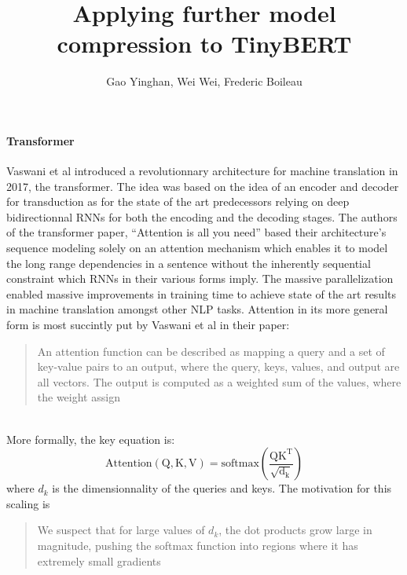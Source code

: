 \documentclass{article}
\title{\textbf{Applying further model compression to TinyBERT}}
\author{Gao Yinghan, Wei Wei, Frederic Boileau}
\begin{document}
\thispagestyle{plain}
\maketitle
\medskip


\paragraph{Transformer} Vaswani et al \cite{allyouneed} introduced a
revolutionnary architecture for machine translation in 2017, the transformer.
The idea was based on the idea of an encoder and decoder for transduction as for
the state of the art predecessors relying on deep bidirectionnal RNNs for both
the encoding and the decoding stages. The authors of the transformer paper,
``Attention is all you need'' based their architecture's sequence modeling
solely on an attention mechanism which enables it to model the long range
dependencies in a sentence without the inherently sequential constraint which
RNNs in their various forms imply. The massive parallelization enabled massive
improvements in training time to achieve state of the art results in machine
translation amongst other NLP tasks.  Attention in its more general form is most
succintly put by Vaswani et al in their paper: \blockcquote{allyouneed}{An
attention function can be described as mapping a query and a set of key-value
pairs to an output, where the query, keys, values, and output are all vectors.
The output is computed as a weighted sum of the values, where the weight
assign}\\

More formally, the key equation is:
\begin{equation}
  \label{eq:1}
  \mathrm{Attention(Q,K,V) =
    \mathrm{softmax}\left(\frac{QK^{T}}{\sqrt{d_{k}}}\right)}
\end{equation}
where $d_{k}$ is the dimensionnality of the queries and keys. The motivation
for this scaling is \blockcquote{allyouneed}{We suspect that for large values of
$d_{k}$, the dot products grow large in magnitude, pushing the softmax function
into regions where it has extremely small gradients}
\end{document}
